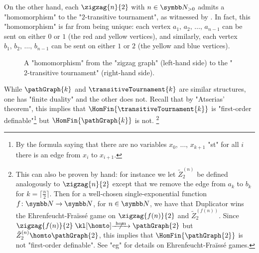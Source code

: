 \begin{example}
	On the other hand, each $\zigzag{n}{2}$ with $n\in\Np$ admits a "homomorphism" to the "$2$-transitive tournament", as witnessed by .%
	In fact, this "homomorphism" is far from being unique:
	each vertex $a_1,\,a_2,\,\dotsc,\,a_{n-1}$ can be sent on either $0$ or $1$
	(the red and yellow vertices), 
	and similarly, each vertex $b_1,\,b_2,\,\dotsc,\,b_{n-1}$ can be sent on either $1$ or $2$
	(the yellow and blue vertices).%
	\begin{figure}
		\centering 
		\begin{tikzpicture}
			
		\end{tikzpicture}
		\caption{\AP\label{fig:zigzag-graph-hom-T2}A "homomorphism" from the "zigzag graph" (left-hand side) to the "$2$-transitive tournament" (right-hand side).}
	\end{figure}
\end{example}

While $\pathGraph{k}$ and $\transitiveTournament{k}$ are similar structures,
one has "finite duality" and the other does not.
Recall that by "Atserias' theorem", this implies that
$\HomFin{\transitiveTournament{k}}$ is "first-order definable"\footnote{By the formula saying that
there are no variables $x_0$, $\dotsc$, $x_{k+1}$ "st" for all $i$ there is an edge from $x_i$ to $x_{i+1}$.} but $\HomFin{\pathGraph{k}}$ is not.%
\footnote{This can also be proven by hand: for 
instance we let $\tilde Z^{(n)}_2$ be defined analogously to $\zigzag{n}{2}$ except
that we remove the edge from $a_{k}$ to $b_k$ for $k = \lceil \frac{n}{2} \rceil$. 
Then for a well-chosen single-exponential function $f\colon \N \to \N$, for $n\in\N$,
we have that Duplicator wins the Ehrenfeucht-Fraïssé game on $\zigzag{f(n)}{2}$ and
$\tilde Z^{(f(n))}_2$. Since $\zigzag{f(n)}{2} \nothomto \pathGraph{2}$ but
$\tilde Z^{(n)}_2 \homto \pathGraph{2}$, this implies that $\HomFin{\pathGraph{2}}$ is not 
"first-order definable". See "eg" \cite[\S~3]{Kolaitis2007FiniteModelTheory} for details on
Ehrenfeucht-Fraïssé games.}


